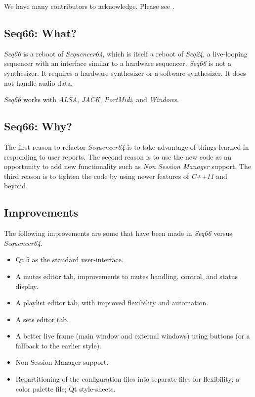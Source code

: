 \documentclass[
 11pt,
 twoside,
 a4paper,
 final                                 %
]{article}
\begin{document}
   We have many contributors to acknowledge.
   Please see .

\subsection{Seq66: What?}
\label{subsec:what_is_seq66}

   \textsl{Seq66} is a reboot of \textsl{Sequencer64}, which
   is itself a reboot of \textsl{Seq24},
   a live-looping sequencer with an interface similar to a hardware sequencer.
   \textsl{Seq66} is not a synthesizer.  It requires a hardware
   synthesizer or a software synthesizer.  It does not handle audio data.

   \textsl{Seq66} works with
   \textsl{ALSA},
   \textsl{JACK},
   \textsl{PortMidi}, and
   \textsl{Windows}.

\subsection{Seq66: Why?}
\label{subsec:introduction_vs_others}

   The first reason to refactor \textsl{Sequencer64} is to take advantage of
   things learned in responding to user reports.  The second reason is to use
   the new code as an opportunity to add new functionality such as
   \textsl{Non Session Manager} support.  The third reason is to tighten the
   code by using newer features of \textsl{C++11} and beyond.

\subsection{Improvements}
\label{subsec:improvements}

   The following improvements are some that have been made in
   \textsl{Seq66} versus \textsl{Sequencer64}.

   \begin{itemize}
      \item Qt 5 as the standard user-interface.
      \item A mutes editor tab, improvements to mutes handling, control, and
         status display.
      \item A playlist editor tab, with improved flexibility and automation.
      \item A sets editor tab.
      \item A better live frame (main window and external windows) using
         buttons (or a fallback to the earlier style).
      \item Non Session Manager support.
      \item Repartitioning of the configuration files into separate files for
         flexibility; a color palette file; Qt style-sheets.
   \end{itemize}
\end{document}
